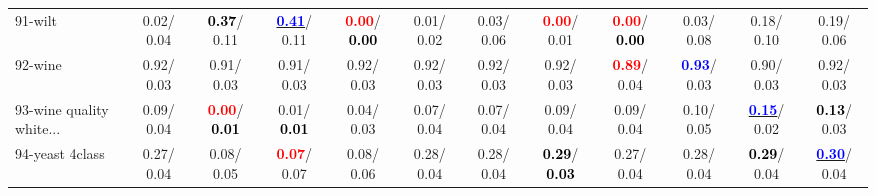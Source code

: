 \begin{table}[h]
\begin{center}
{\begin{tabular}{lc|c|c|c|c|c|c|c|c|c|c}
91-wilt &   0.02/  0.04 & \textcolor{black}{\textbf{  0.37}}/  0.11 & \underline{\textcolor{blue}{\textbf{  0.41}}}/  0.11 & \textcolor{red}{\textbf{  0.00}}/\textcolor{black}{\textbf{  0.00}} &   0.01/  0.02 &   0.03/  0.06 & \textcolor{red}{\textbf{  0.00}}/  0.01 & \textcolor{red}{\textbf{  0.00}}/\textcolor{black}{\textbf{  0.00}} &   0.03/  0.08 &   0.18/  0.10 &   0.19/  0.06 \\
92-wine &   0.92/  0.03 &   0.91/  0.03 &   0.91/  0.03 &   0.92/  0.03 &   0.92/  0.03 &   0.92/  0.03 &   0.92/  0.03 & \textcolor{red}{\textbf{  0.89}}/  0.04 & \textcolor{blue}{\textbf{  0.93}}/  0.03 &   0.90/  0.03 &   0.92/  0.03 \\ \hline
93-wine quality white... &   0.09/  0.04 & \textcolor{red}{\textbf{  0.00}}/\textcolor{black}{\textbf{  0.01}} &   0.01/\textcolor{black}{\textbf{  0.01}} &   0.04/  0.03 &   0.07/  0.04 &   0.07/  0.04 &   0.09/  0.04 &   0.09/  0.04 &   0.10/  0.05 & \underline{\textcolor{blue}{\textbf{  0.15}}}/  0.02 & \textcolor{black}{\textbf{  0.13}}/  0.03 \\
94-yeast 4class &   0.27/  0.04 &   0.08/  0.05 & \textcolor{red}{\textbf{  0.07}}/  0.07 &   0.08/  0.06 &   0.28/  0.04 &   0.28/  0.04 & \textcolor{black}{\textbf{  0.29}}/\textcolor{black}{\textbf{  0.03}} &   0.27/  0.04 &   0.28/  0.04 & \textcolor{black}{\textbf{  0.29}}/  0.04 & \underline{\textcolor{blue}{\textbf{  0.30}}}/  0.04 \\\end{tabular}
}\label{strats2bNB}
\end{center}
\end{table}
                                     